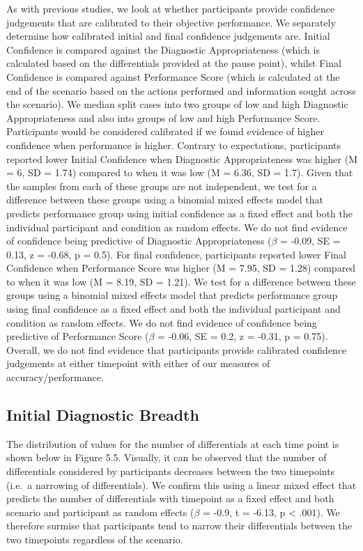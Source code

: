 \documentclass[a4paper, nobind]{templates/ociamthesis}
\begin{document}
\hfill\break
As with previous studies, we look at whether participants provide confidence judgements that are calibrated to their objective performance. We separately determine how calibrated initial and final confidence judgements are. Initial Confidence is compared against the Diagnostic Appropriateness (which is calculated based on the differentials provided at the pause point), whilst Final Confidence is compared against Performance Score (which is calculated at the end of the scenario based on the actions performed and information sought across the scenario). We median split cases into two groups of low and high Diagnostic Appropriateness and also into groups of low and high Performance Score. Participants would be considered calibrated if we found evidence of higher confidence when performance is higher. Contrary to expectations, participants reported lower Initial Confidence when Diagnostic Appropriateness was higher (M = 6, SD = 1.74) compared to when it was low (M = 6.36, SD = 1.7). Given that the samples from each of these groups are not independent, we test for a difference between these groups using a binomial mixed effects model that predicts performance group using initial confidence as a fixed effect and both the individual participant and condition as random effects. We do not find evidence of confidence being predictive of Diagnostic Appropriateness (\(\beta\) = -0.09, SE = 0.13, z = -0.68, p = 0.5). For final confidence, participants reported lower Final Confidence when Performance Score was higher (M = 7.95, SD = 1.28) compared to when it was low (M = 8.19, SD = 1.21). We test for a difference between these groups using a binomial mixed effects model that predicts performance group using final confidence as a fixed effect and both the individual participant and condition as random effects. We do not find evidence of confidence being predictive of Performance Score (\(\beta\) = -0.06, SE = 0.2, z = -0.31, p = 0.75). Overall, we do not find evidence that participants provide calibrated confidence judgements at either timepoint with either of our measures of accuracy/performance.

\subsection*{Initial Diagnostic Breadth}\label{initial-diagnostic-breadth}

The distribution of values for the number of differentials at each time point is shown below in Figure 5.5. Visually, it can be observed that the number of differentials considered by participants decreases between the two timepoints (i.e.~a narrowing of differentials). We confirm this using a linear mixed effect that predicts the number of differentials with timepoint as a fixed effect and both scenario and participant as random effects (\(\beta\) = -0.9, t = -6.13, p \textless{} .001). We therefore surmise that participants tend to narrow their differentials between the two timepoints regardless of the scenario.
\end{document}
